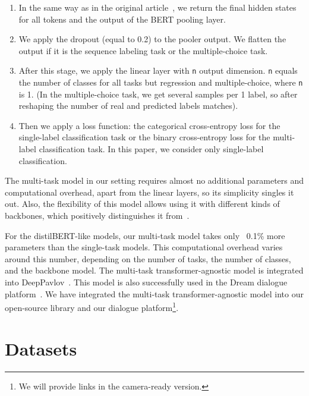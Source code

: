 \begin{enumerate}

    \item In the same way as in the original article~\cite{bert}, we return the final hidden states for all tokens and the output of the BERT pooling layer.

    \item We apply the dropout (equal to 0.2) to the pooler output. We flatten the output if it is the sequence labeling task or the multiple-choice task.

    \item After this stage, we apply the linear layer with \texttt{n} output dimension. \texttt{n} equals the number of classes for all tasks but regression and multiple-choice, where \texttt{n} is 1. (In the multiple-choice task, we get several samples per 1 label, so after reshaping the number of real and predicted labels matches). 

    \item Then we apply a loss function: the categorical cross-entropy loss for the single-label classification task or the binary cross-entropy loss for the multi-label classification task. In this paper, we consider only single-label classification.

\end{enumerate}

The multi-task model in our setting requires almost no additional parameters and computational overhead, apart from the linear layers, so its simplicity singles it out. Also, the flexibility of this model allows using it with different kinds of backbones, which positively distinguishes it from~\cite{PAL:19}.

For the distilBERT-like models, our multi-task model takes only ~0.1\% more parameters than the single-task models. This computational overhead varies around this number, depending on the number of tasks, the number of classes, and the backbone model. 
\ifinterspeechfinal
The multi-task transformer-agnostic model is integrated into DeepPavlov~\cite{Burtsev2018DeepPavlovAO}. This model is also successfully used in the Dream dialogue platform~\cite{baymurzina2021dream}. 
\else
We have integrated the multi-task transformer-agnostic model into our open-source library and our dialogue platform\footnote{We will provide links in the camera-ready version.}.
\fi

\section{Datasets}


